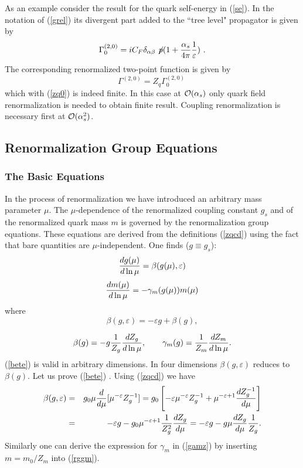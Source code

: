 \documentclass[12pt]{article}
\def\eps{\varepsilon}
\newcommand{\eqn}{\ref}
\newcommand{\bea}{\begin{eqnarray}}
\newcommand{\eea}{\end{eqnarray}}
\newcommand{\be}{\begin{equation}}
\newcommand{\ee}{\end{equation}}
\newcommand{\ord}{{\cal O}}
\begin{document}
\begin{itemize}
As an example consider the result for the quark self-energy in
(\ref{se}). In the notation of (\ref{grel})
its divergent part added to the ``tree level" propagator is
given by
\begin{equation}
\Gamma_0^{(2,0)}=i C_F \delta_{\alpha\beta}\not\! p (1+ 
\frac{\alpha_s}{4\pi} \frac{1}{\varepsilon})~. 
\end{equation}
The corresponding renormalized two-point function is given by
\be
\Gamma^{(2,0)}=Z_q \Gamma_0^{(2,0)}~
\ee
which with (\ref{zq0}) is indeed finite. In this case at $\ord(\alpha_s)$
only quark field renormalization is needed to obtain finite result.
Coupling renormalization is necessary first at $\ord(\alpha_s^2)$.
\subsection{Renormalization Group Equations}
\subsubsection{The Basic Equations}
In the process of renormalization we have introduced an arbitrary
mass parameter $\mu$. The $\mu$-dependence of the renormalized
coupling constant $g_s$ and of the renormalized quark mass $m$
is governed by the renormalization group equations.
These equations are derived from the
definitions (\eqn{zqcd}) using the fact  that bare quantities are
$\mu$-independent. 
One finds ($g\equiv g_s$):
\begin{equation}\label{rgbe}
{dg(\mu)\over d\ln\mu}=\beta(g(\mu), \eps)  \end{equation}
\begin{equation}\label{rggm}
{d m(\mu)\over d\ln\mu}=-\gamma_m(g(\mu)) m(\mu)  \end{equation}
where
\begin{equation}\label{bete}
\beta(g, \eps)= -\eps g+\beta(g),  \end{equation}

\begin{equation}\label{gamz} 
\beta(g)=-g{1\over Z_g}{d Z_g\over d\ln\mu},\quad\quad
\gamma_m(g)={1\over Z_m}{d Z_m\over d\ln\mu}.
  \end{equation}
(\ref{bete}) is valid in arbitrary
dimensions. In four dimensions $\beta(g, \eps)$ reduces to $\beta(g)$.
Let us prove (\ref{bete}) \cite{Gross}. Using (\eqn{zqcd}) we have 
\bea\label{prove1}
\beta(g,\eps) &=& g_0 \mu {d\over d\mu} [\mu^{-\eps} Z_g^{-1}]
= g_0 
\left[-\eps \mu^{-\eps} Z_g^{-1} + \mu^{-\eps+1}\frac{d Z_g^{-1}}{d\mu}\right]
\nonumber\\ 
&= &-\eps g-g_0 \mu^{-\eps+1}{1\over Z^2_g}{d Z_g \over d\mu}
=-\eps g-g\mu {d Z_g \over d\mu}{1\over Z_g}.
\eea
Similarly one can derive the expression for $\gamma_m$ in (\ref{gamz})
by inserting $m=m_0/Z_m$ into (\ref{rggm}).


\end{itemize}
\end{document}
